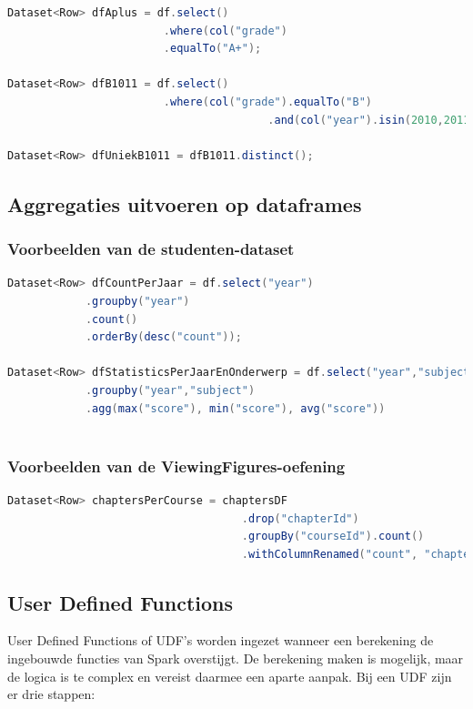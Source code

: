 \documentclass[a4paper,10pt,twoside]{report}
\begin{document}
\begin{lstlisting}[language=Java]
Dataset<Row> dfAplus = df.select()
						.where(col("grade")
						.equalTo("A+");
						
Dataset<Row> dfB1011 = df.select()
						.where(col("grade").equalTo("B")
										.and(col("year").isin(2010,2011)));
						
Dataset<Row> dfUniekB1011 = dfB1011.distinct();
\end{lstlisting}

\subsection{Aggregaties uitvoeren op dataframes}

\subsubsection{Voorbeelden van de studenten-dataset}

\begin{lstlisting}[language=Java]
Dataset<Row> dfCountPerJaar = df.select("year")
			.groupby("year")
			.count()
			.orderBy(desc("count"));
			
Dataset<Row> dfStatisticsPerJaarEnOnderwerp = df.select("year","subject","score")
			.groupby("year","subject")
			.agg(max("score"), min("score"), avg("score"))
			
\end{lstlisting}

\subsubsection{Voorbeelden van de ViewingFigures-oefening}

\begin{lstlisting}[language=Java]
Dataset<Row> chaptersPerCourse = chaptersDF
									.drop("chapterId")
									.groupBy("courseId").count()
									.withColumnRenamed("count", "chapters");
\end{lstlisting}


\subsection{User Defined Functions}

User Defined Functions of UDF's worden ingezet wanneer een berekening de ingebouwde functies van Spark overstijgt. De berekening maken is mogelijk, maar de logica is te complex en vereist daarmee een aparte aanpak. Bij een UDF zijn er drie stappen:
\end{document}
